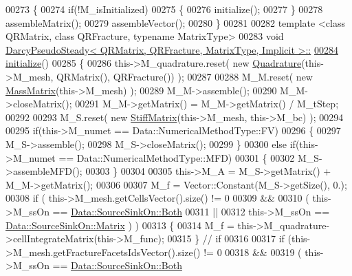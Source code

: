 \begin{DoxyCode}
00273 \{
00274     \textcolor{keywordflow}{if}(!M\_isInitialized)
00275     \{
00276         initialize();
00277     \}
00278     assembleMatrix();
00279     assembleVector();
00280 \}
00281 
00282 \textcolor{keyword}{template} <\textcolor{keyword}{class} QRMatrix, \textcolor{keyword}{class} QRFracture, \textcolor{keyword}{typename} MatrixType>
00283 \textcolor{keywordtype}{void} \hyperlink{classFVCode3D_1_1DarcyPseudoSteady}{DarcyPseudoSteady< QRMatrix, QRFracture, MatrixType, Implicit >::}
\hypertarget{DarcyPseudoSteady_8hpp_source.tex_l00284}{}\hyperlink{classFVCode3D_1_1DarcyPseudoSteady_3_01QRMatrix_00_01QRFracture_00_01MatrixType_00_01Implicit_01_4_a992ed5e76ce902c7ffa07824f0494997}{00284} \hyperlink{classFVCode3D_1_1DarcyPseudoSteady}{initialize}()
00285 \{
00286     this->M\_quadrature.reset( \textcolor{keyword}{new} \hyperlink{classFVCode3D_1_1Quadrature}{Quadrature}(this->M\_mesh, QRMatrix(), QRFracture()) );
00287 
00288     M\_M.reset( \textcolor{keyword}{new} \hyperlink{classFVCode3D_1_1MassMatrix}{MassMatrix}(this->M\_mesh) );
00289     M\_M->assemble();
00290     M\_M->closeMatrix();
00291     M\_M->getMatrix() = M\_M->getMatrix() / M\_tStep;
00292 
00293     M\_S.reset( \textcolor{keyword}{new} \hyperlink{classFVCode3D_1_1StiffMatrix}{StiffMatrix}(this->M\_mesh, this->M\_bc) );
00294 
00295     \textcolor{keywordflow}{if}(this->M\_numet == Data::NumericalMethodType::FV)
00296     \{
00297         M\_S->assemble();
00298         M\_S->closeMatrix();
00299     \}
00300     \textcolor{keywordflow}{else} \textcolor{keywordflow}{if}(this->M\_numet == Data::NumericalMethodType::MFD)
00301     \{
00302         M\_S->assembleMFD();
00303     \}
00304 
00305     this->M\_A = M\_S->getMatrix() + M\_M->getMatrix();
00306 
00307     M\_f = Vector::Constant(M\_S->getSize(), 0.);
00308     \textcolor{keywordflow}{if} ( this->M\_mesh.getCellsVector().size() != 0
00309             &&
00310             ( this->M\_ssOn == \hyperlink{classFVCode3D_1_1Data_a4d66e2e205b350cb240820540339e1a3a130c5b3473c57faa76e2a1c54e26f88e}{Data::SourceSinkOn::Both}
00311                 ||
00312               this->M\_ssOn == \hyperlink{classFVCode3D_1_1Data_a4d66e2e205b350cb240820540339e1a3af53df0293e169f562bc1d9a20e1d2589}{Data::SourceSinkOn::Matrix} ) )
00313     \{
00314         M\_f = this->M\_quadrature->cellIntegrateMatrix(this->M\_func);
00315     \} \textcolor{comment}{// if}
00316 
00317     \textcolor{keywordflow}{if} (this->M\_mesh.getFractureFacetsIdsVector().size() != 0
00318             &&
00319             ( this->M\_ssOn == \hyperlink{classFVCode3D_1_1Data_a4d66e2e205b350cb240820540339e1a3a130c5b3473c57faa76e2a1c54e26f88e}{Data::SourceSinkOn::Both}

\end{DoxyCode}
